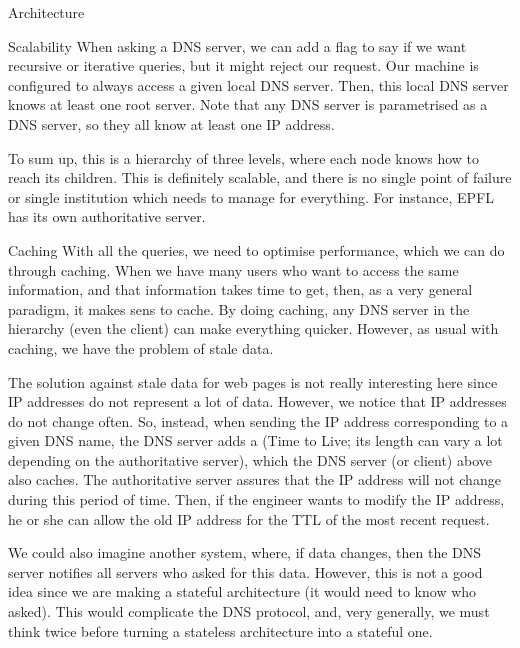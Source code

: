 \documentclass[a4paper]{article}
\begin{document}
\begin{parag}{Architecture}
\begin{subparag}{Scalability}
        When asking a DNS server, we can add a flag to say if we want recursive or iterative queries, but it might reject our request. Our machine is configured to always access a given local DNS server. Then, this local DNS server knows at least one root server. Note that any DNS server is parametrised as a DNS server, so they all know at least one IP address.


        To sum up, this is a hierarchy of three levels, where each node knows how to reach its children. This is definitely scalable, and there is no single point of failure or single institution which needs to manage for everything. For instance, EPFL has its own authoritative server.
    \end{subparag}
    
    
    \begin{subparag}{Caching}
        With all the queries, we need to optimise performance, which we can do through caching. When we have many users who want to access the same information, and that information takes time to get, then, as a very general paradigm, it makes sens to cache. By doing caching, any DNS server in the hierarchy (even the client) can make everything quicker. However, as usual with caching, we have the problem of stale data.

        The solution against stale data for web pages is not really interesting here since IP addresses do not represent a lot of data. However, we notice that IP addresses do not change often. So, instead, when sending the IP address corresponding to a given DNS name, the DNS server adds a  (Time to Live; its length can vary a lot depending on the authoritative server), which the DNS server (or client) above also caches. The authoritative server assures that the IP address will not change during this period of time. Then, if the engineer wants to modify the IP address, he or she can allow the old IP address for the TTL of the most recent request.

        We could also imagine another system, where, if data changes, then the DNS server notifies all servers who asked for this data. However, this is not a good idea since we are making a stateful architecture (it would need to know who asked). This would complicate the DNS protocol, and, very generally, we must think twice before turning a stateless architecture into a stateful one.
    \end{subparag}
    
\end{parag}
\end{document}
